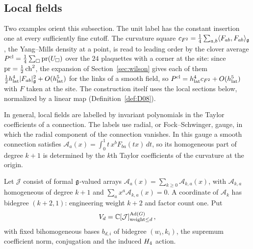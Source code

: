\subsection{Local fields}\label{sec:local-fields}

Two examples orient this subsection. The unit label has the constant insertion one at every sufficiently fine cutoff. The curvature square $c_{F^2}=\frac14\sum_{a,b}\langle F_{ab},F_{ab}\rangle_{\mathfrak{g}}$, the Yang--Mills density at a point, is read to leading order by the clover average $P^{\rm cl}=\frac14\sum_\square\operatorname{pr}(U_\square)$ over the $24$ plaquettes with a corner at the site: since $\operatorname{pr}=\frac12\operatorname{ch}^2$, the expansion of Section~\ref{sec:wilson} gives each of them $\frac12h_{\rm lat}^4|F_{ab}|_{\mathfrak{g}}^2+O(h_{\rm lat}^5)$ for the links of a smooth field, so $P^{\rm cl}=h_{\rm lat}^4c_{F^2}+O(h_{\rm lat}^5)$ with $F$ taken at the site. The construction itself uses the local sections below, normalized by a linear map (Definition~\ref{def:D08}).

In general, local fields are labelled by invariant polynomials in the Taylor coefficients of a connection. The labels use radial, or Fock--Schwinger, gauge, in which the radial component of the connection vanishes. In this gauge a smooth connection satisfies $\mathcal A_a(x)=\int_0^1t\,x^bF_{ba}(tx)\,dt$, so its homogeneous part of degree $k+1$ is determined by the $k$th Taylor coefficients of the curvature at the origin.

\begin{definition}\label{def:D07}
Let $\mathcal J$ consist of formal $\mathfrak{g}$-valued arrays $\mathcal A_a(x)=\sum_{k\ge0}\mathcal A_{k,a}(x)$, with $\mathcal A_{k,a}$ homogeneous of degree $k+1$ and $\sum_a x^a\mathcal A_{k,a}(x)=0$. A coordinate of $\mathcal A_k$ has bidegree $(k+2,1)$: engineering weight $k+2$ and factor count one. Put
\begin{equation*}
V_d=\mathbb{C}[\mathcal J]^{\operatorname{Ad}(G)}_{\mathrm{weight}\le d}\,,
\end{equation*}
with fixed bihomogeneous bases $b_{d,i}$ of bidegree $(w_i,k_i)$, the supremum coefficient norm, conjugation and the induced $H_4$ action.
\end{definition}

